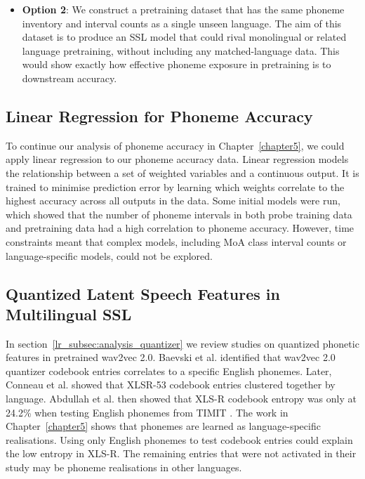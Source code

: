 \begin{itemize}
    \item \textbf{Option 2}: We construct a pretraining dataset that has the same phoneme inventory and interval counts as a single unseen language. The aim of this dataset is to produce an SSL model that could rival monolingual or related language pretraining, without including any matched-language data. This would show exactly how effective phoneme exposure in pretraining is to downstream accuracy.
\end{itemize}
\fi

\subsection{Linear Regression for Phoneme Accuracy}

To continue our analysis of phoneme accuracy in Chapter~\ref{chapter5}, we could apply linear regression to our phoneme accuracy data. Linear regression models the relationship between a set of weighted variables and a continuous output. It is trained to minimise prediction error by learning which weights correlate to the highest accuracy across all outputs in the data. Some initial models were run, which showed that the number of phoneme intervals in both probe training data and pretraining data had a high correlation to phoneme accuracy. However, time constraints meant that complex models, including MoA class interval counts or language-specific models, could not be explored. 

\subsection{Quantized Latent Speech Features in Multilingual SSL}

In section~\ref{lr_subsec:analysis_quantizer} we review studies on quantized phonetic features in pretrained wav2vec 2.0. Baevski et al. \cite{wav2vec} identified that wav2vec 2.0 quantizer codebook entries correlates to a specific English phonemes. Later, Conneau et al. \cite{XLSR-53} showed that XLSR-53 codebook entries clustered together by language. Abdullah et al. \cite{abdullah2023information} then showed that XLS-R codebook entropy was only at 24.2\% when testing English phonemes from TIMIT \cite{timit}. The work in Chapter~\ref{chapter5} shows that phonemes are learned as language-specific realisations. Using only English phonemes to test codebook entries could explain the low entropy in XLS-R. The remaining entries that were not activated in their study may be phoneme realisations in other languages.

